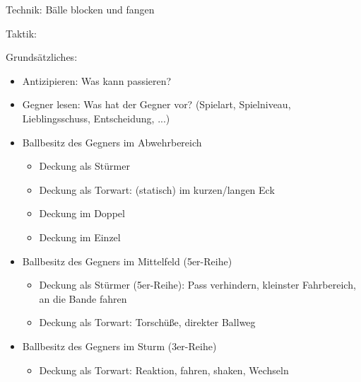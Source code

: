 Technik:
Bälle blocken und fangen

Taktik:

Grundsätzliches:

\begin{itemize}
\item Antizipieren: Was kann passieren?
\item Gegner lesen: Was hat der Gegner vor? (Spielart, Spielniveau, Lieblingsschuss, Entscheidung, ...)
\end{itemize}


\begin{itemize}
\item Ballbesitz des Gegners im Abwehrbereich 
\begin{itemize}
\item Deckung als Stürmer
\item Deckung als Torwart: (statisch) im kurzen/langen Eck
\item Deckung im Doppel
\item Deckung im Einzel
\end{itemize}
\item Ballbesitz des Gegners im Mittelfeld (5er-Reihe)
\begin{itemize}
\item Deckung als Stürmer (5er-Reihe): Pass verhindern, kleinster Fahrbereich, an die Bande fahren
\item Deckung als Torwart: Torschüße, direkter Ballweg
\end{itemize}
\item Ballbesitz des Gegners im Sturm (3er-Reihe)
\begin{itemize}
\item Deckung als Torwart: Reaktion, fahren, shaken, Wechseln
\end{itemize}
\end{itemize}



